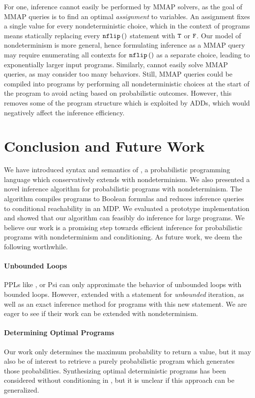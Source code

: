 For one, \NDICE inference cannot easily be performed by MMAP solvers, as the goal of MMAP queries is to find an optimal \textit{assignment} to variables.
An assignment fixes a single value for every nondeterministic choice, which in the context of \NDICE programs means statically replacing every $\texttt{nflip}\left(\right) $ statement with $\texttt{T}$ or $\texttt{F}$.
Our model of nondeterminism is more general, hence formulating \NDICE inference as a MMAP query may require enumerating all contexts for $\texttt{nflip}\left(\right) $ as a separate choice, leading to exponentially larger input programs.
%
Similarly, \NDICE cannot easily solve MMAP queries, as \NDICE may consider too many behaviors.
Still, MMAP queries could be compiled into \NDICE programs by performing all nondeterministic choices at the start of the program to avoid acting based on probabilistic outcomes. 
However, this removes some of the program structure which is exploited by ADDs, which would negatively affect the inference efficiency.



\section{Conclusion and Future Work}\label{sec:future}
We have introduced syntax and semantics of \NDICE, a probabilistic programming language which conservatively extends \DICE with nondeterminism.
We also presented a novel inference algorithm for probabilistic programs with nondeterminism.
The algorithm compiles programs to Boolean formulas and reduces inference queries to conditional reachability in an MDP.
We evaluated a prototype implementation and showed that our algorithm can feasibly do inference for large programs.
We believe our work is a promising step towards efficient inference for probabilistic programs with nondeterminism and conditioning.
As future work, we deem the following worthwhile.

\paragraph{Unbounded Loops}
PPLs like \DICE, \NDICE or Psi \cite{gehr2016psi} can only approximate the behavior of unbounded loops with bounded loops.
However, \citet{torres2024iteration} extended \DICE with a statement for \textit{unbounded} iteration, as well as an exact inference method for programs with this new statement.
We are eager to see if their work can be extended with nondeterminism.

\paragraph{Determining Optimal Programs}
Our work only determines the maximum probability to return a value, but it may also be of interest to retrieve a purely probabilistic program which generates those probabilities.
Synthesizing optimal deterministic programs has been considered without conditioning in \citet{batz2024programmatic}, but it is unclear if this approach can be generalized.

